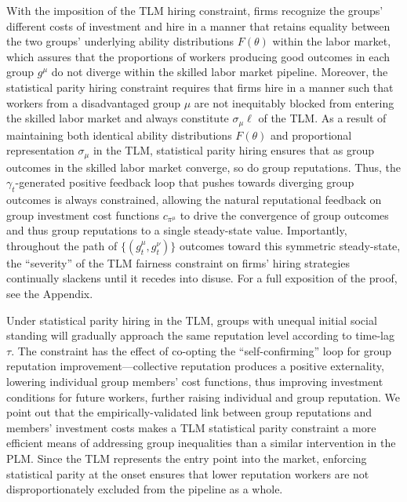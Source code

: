 \documentclass[sigconf]{acmart}
\theoremstyle{definition}
\begin{document}
With the imposition of the TLM hiring constraint, firms recognize the groups' different costs of investment and hire in a manner that retains equality between the two groups' underlying ability distributions $F(\theta)$ within the labor market, which assures that the proportions of workers producing good outcomes in each group $g^\mu$ do not diverge within the skilled labor market pipeline. Moreover, the statistical parity hiring constraint requires that firms hire in a manner such that workers from a disadvantaged group $\mu$ are not inequitably blocked from entering the skilled labor market and always constitute $\sigma_\mu \ell$ of the TLM. As a result of maintaining both identical ability distributions $F(\theta)$ and proportional representation $\sigma_\mu$ in the TLM, statistical parity hiring ensures that as group outcomes in the skilled labor market converge, so do group reputations.
Thus, the $\gamma_t$-generated positive feedback loop that pushes towards diverging group outcomes is always constrained, allowing the natural reputational feedback on group investment cost functions $c_{\pi^\mu}$ to drive the convergence of group outcomes and thus group reputations to a single steady-state value. Importantly, throughout the path of $\{(g^\mu_t, g^\nu_t)\}$ outcomes toward this symmetric steady-state, the ``severity'' of the TLM fairness constraint on firms' hiring strategies continually slackens until it recedes into disuse. For a full exposition of the proof, see the Appendix. 

Under statistical parity hiring in the TLM, groups with unequal initial social standing will gradually approach the same reputation level according to time-lag $\tau$. 
The constraint has the effect of co-opting the ``self-confirming'' loop for group reputation improvement---collective reputation produces a positive externality, lowering individual group members' cost functions, thus improving investment conditions for future workers, further raising individual and group reputation. We point out that the empirically-validated link between group reputations and members' investment costs makes a TLM statistical parity constraint a more efficient means of addressing group inequalities than a similar intervention in the PLM. Since the TLM represents the entry point into the market, enforcing statistical parity at the onset ensures that lower reputation workers are not disproportionately excluded from the pipeline as a whole.
\end{document}
